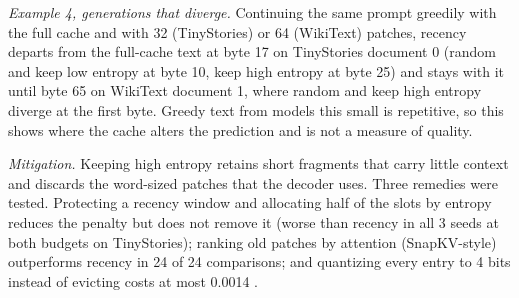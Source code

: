 \emph{Example 4, generations that diverge.} Continuing the same prompt greedily with the full cache and with 32 (TinyStories) or 64 (WikiText) patches, recency departs from the full-cache text at byte 17 on TinyStories document 0 (random and keep low entropy at byte 10, keep high entropy at byte 25) and stays with it until byte 65 on WikiText document 1, where random and keep high entropy diverge at the first byte. Greedy text from models this small is repetitive, so this shows where the cache alters the prediction and is not a measure of quality.

\textit{Mitigation.} Keeping high entropy retains short fragments that carry little context and discards the word-sized patches that the decoder uses. Three remedies were tested. Protecting a recency window and allocating half of the slots by entropy reduces the penalty but does not remove it (worse than recency in all 3 seeds at both budgets on TinyStories); ranking old patches by attention (SnapKV-style) outperforms recency in 24 of 24 comparisons; and quantizing every entry to 4 bits instead of evicting costs at most 0.0014 \bpb.

